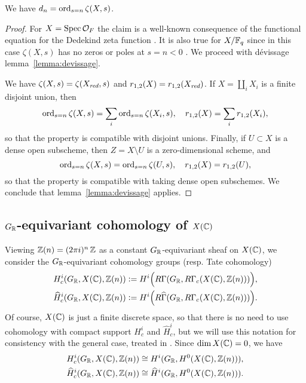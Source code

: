 \documentclass{article}
\numberwithin{equation}{section}
\begin{document}
\begin{proposition}
  \label{prop:vanishing-order-equals-dn}
  We have $d_n = \operatorname{ord}_{s = n} \zeta (X,s)$.

  \begin{proof}
    For $X = \operatorname{Spec} \mathcal{O}_F$ the claim is a well-known consequence of the
    functional equation for the Dedekind zeta function
    \cite[\S VII.5]{Neukirch-1999}. It is also true for $X/\mathbb{F}_q$ since in this
    case $\zeta (X,s)$ has no zeros or poles at $s = n < 0$
    \cite[pp.\,26--27]{Katz-1994}. We proceed with dévissage
    lemma~\ref{lemma:devissage}.

    We have $\zeta (X,s) = \zeta (X_{\text{\it red}},s)$ and
    $r_{1,2} (X) = r_{1,2} (X_{\text{\it red}})$.
    If $X = \coprod_i X_i$ is a finite disjoint union, then
    \[ \operatorname{ord}_{s = n} \zeta (X,s) = \sum_i \operatorname{ord}_{s = n} \zeta (X_i,s),
      \quad
      r_{1,2} (X) = \sum_i r_{1,2} (X_i), \]
    so that the property is compatible with disjoint unions. Finally, if
    $U \subset X$ is a dense open subscheme, then $Z = X\setminus U$ is
    a zero-dimensional scheme, and
    \[ \operatorname{ord}_{s = n} \zeta (X,s) = \operatorname{ord}_{s = n} \zeta (U,s),
      \quad
      r_{1,2} (X) = r_{1,2} (U), \]
    so that the property is compatible with taking dense open subschemes.
    We conclude that lemma~\ref{lemma:devissage} applies.
  \end{proof}
\end{proposition}

\subsection*{$G_{\mathbb{R}}$-equivariant cohomology of $X (\mathbb{C})$}

Viewing $\mathbb{Z} (n) = (2\pi i)^n\,\mathbb{Z}$ as a constant $G_{\mathbb{R}}$-equivariant sheaf on
$X (\mathbb{C})$, we consider the $G_{\mathbb{R}}$-equivariant cohomology groups (resp. Tate
cohomology)
\begin{align*}
  H^i_c (G_{\mathbb{R}}, X (\mathbb{C}), \mathbb{Z}(n)) & \mathrel{\mathop:}= H^i \Bigl(R\Gamma (G_{\mathbb{R}}, R\Gamma_c (X (\mathbb{C}), \mathbb{Z}(n)))\Bigr), \\
  \widehat{H}^i_c (G_{\mathbb{R}}, X (\mathbb{C}), \mathbb{Z}(n)) & \mathrel{\mathop:}= H^i \Bigl(R\widehat{\Gamma} (G_{\mathbb{R}}, R\Gamma_c (X (\mathbb{C}), \mathbb{Z}(n)))\Bigr).
\end{align*}
Of course, $X (\mathbb{C})$ is just a finite discrete space, so that there is no need
to use cohomology with compact support $H^i_c$ and $\widehat{H}^i_c$, but we
will use this notation for consistency with the general case, treated in
\cite{Beshenov-Weil-etale-1}. Since $\dim X (\mathbb{C}) = 0$, we have
\begin{align*}
  H^i_c (G_{\mathbb{R}}, X (\mathbb{C}), \mathbb{Z}(n)) & \cong H^i (G_{\mathbb{R}}, H^0 (X (\mathbb{C}), \mathbb{Z}(n))), \\
  \widehat{H}^i_c (G_{\mathbb{R}}, X (\mathbb{C}), \mathbb{Z}(n)) & \cong \widehat{H}^i (G_{\mathbb{R}}, H^0 (X (\mathbb{C}), \mathbb{Z}(n))).
\end{align*}
\end{document}
